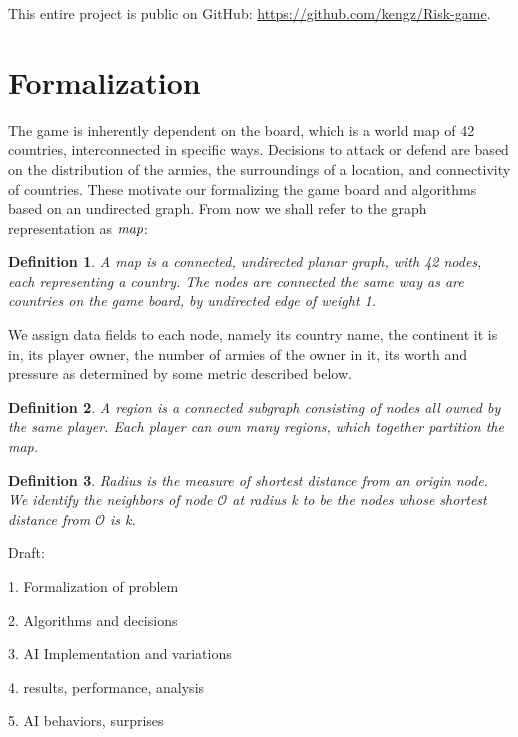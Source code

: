 \documentclass[12pt]{article}  %
\newtheorem{definition}{Definition}
\begin{document}
This entire project is public on GitHub: \url{https://github.com/kengz/Risk-game}.



\section{Formalization} \label{formalization}

The game is inherently dependent on the board, which is a world map of 42 countries, interconnected in specific ways. Decisions to attack or defend are based on the distribution of the armies, the surroundings of a location, and connectivity of countries. These motivate our formalizing the game board and algorithms based on an undirected graph. From now we shall refer to the graph representation as $\emph{map}$:

\begin{definition} A map is a connected, undirected planar graph, with 42 nodes, each representing a country. The nodes are connected the same way as are countries on the game board, by undirected edge of weight 1.
\end{definition}

We assign data fields to each node, namely its country name, the continent it is in, its player owner, the number of armies of the owner in it, its worth and pressure as determined by some metric described below.


\begin{definition}
A region is a connected subgraph consisting of nodes all owned by the same player. Each player can own many regions, which together partition the map.
\end{definition}

\begin{definition}
Radius is the measure of shortest distance from an origin node. We identify the neighbors of node $\mathcal{O}$ at radius k to be the nodes whose shortest distance from $\mathcal{O}$ is k.
\end{definition}




Draft:

1. Formalization of problem

2. Algorithms and decisions

3. AI Implementation and variations

4. results, performance, analysis

5. AI behaviors, surprises
\end{document}
